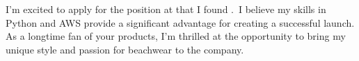 



I'm excited to apply for the \position\;position at \company\;that I found \source.
\companynews\,I believe my skills in
Python and AWS provide a significant advantage for creating a successful launch. As a longtime fan of your products, I'm thrilled at the opportunity to bring my unique style and passion for beachwear to the company.
